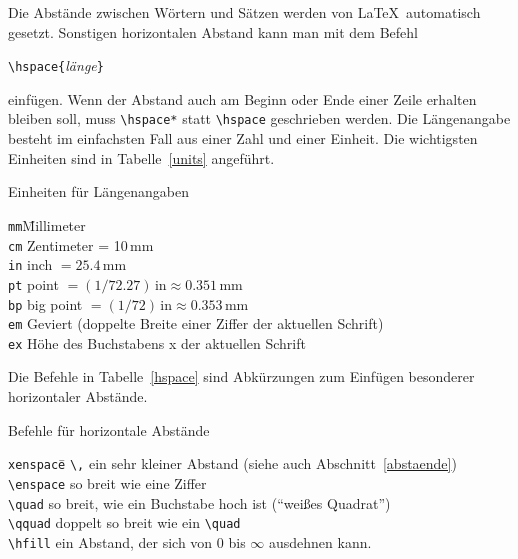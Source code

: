 Die Abstände zwischen Wörtern und Sätzen werden von \LaTeX\ 
automatisch gesetzt.
Sonstigen horizontalen Abstand kann man mit dem Befehl
\begin{beispiel}
\lstinline|\hspace{|\textit{länge}\lstinline|}|
\end{beispiel}
einfügen.
Wenn der Abstand auch am Beginn oder Ende einer Zeile
erhalten bleiben soll, muss \lstinline|\hspace*| statt \lstinline|\hspace|
geschrieben werden.
Die Längenangabe besteht im einfachsten Fall aus einer Zahl
und einer Einheit.  Die wichtigsten Einheiten sind in
Tabelle~\ref{units} angeführt.
\begin{table}[b]
\caption{Einheiten für Längenangaben} \label{units}
\begin{lminipage}{11cm}
\begin{tabbing}
\texttt{mm}\qquad \= Millimeter                               \\
\texttt{cm} \> Zentimeter = 10\,mm                            \\
\texttt{in} \> inch \(= 25.4\,\mathrm{mm} \)                  \\
\texttt{pt} \> point \( =(1/72.27)\,\mathrm{in}
                        \approx 0.351\,\mathrm{mm}\)          \\
\texttt{bp} \> big point \( =(1/72)\,\mathrm{in}
                            \approx 0.353\,\mathrm{mm} \)      \\
\texttt{em} \> Geviert (doppelte Breite einer Ziffer der aktuellen Schrift)\\
\texttt{ex} \> Höhe des Buchstabens x der aktuellen Schrift
\end{tabbing}                    
\end{lminipage}
\end{table}
Die Befehle in Tabelle~\ref{hspace} sind Abkürzungen zum Einfügen
besonderer horizontaler Abstände.
\begin{table}[t]
\caption{Befehle für horizontale Abstände} \label{hspace}
\begin{lminipage}{13cm}
\begin{tabbing}
\texttt{xenspace}\qquad \= \kill
\lstinline|\,|       \> ein sehr kleiner Abstand (siehe auch Abschnitt~\ref{abstaende})\\
\lstinline|\enspace| \> so breit wie eine Ziffer \\
\lstinline|\quad|    \> so breit, wie ein Buchstabe hoch ist
                   ("`weißes Quadrat"') \\
\lstinline|\qquad|   \> doppelt so breit wie ein \lstinline|\quad| \\
\lstinline|\hfill|   \> ein Abstand, der sich von 0 bis \(\infty\)
                   ausdehnen kann.
\end{tabbing}
\end{lminipage}
\end{table}
